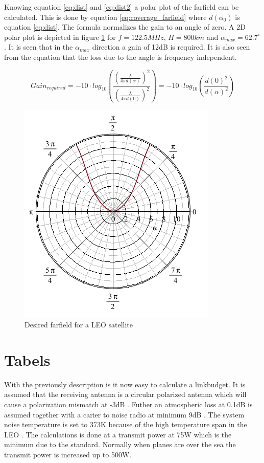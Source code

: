 Knowing equation \ref{eq:dist} and \ref{eq:dist2} a polar plot of the farfield can be calculated. This is done by equation \ref{eq:coverage_farfield} where $d(\alpha_0)$ is equation \ref{eq:dist}. The formula normalizes the gain to an angle of zero. A 2D polar plot 
is depicted in figure \ref{fig:sat_farfield_polar} for $f=122.5MHz$, $H=800km$ and $\alpha_{max} = 62.7^{\circ}$. It is seen that in the $\alpha_{max}$ direction a gain of 12dB is required. It is also seen from the equation that the loss due to the angle is frequency independent.  
  
\begin{equation}
Gain_{required} = -10\cdot log_{10}(\frac{(\frac{\lambda}{4 \pi d(\alpha) })^2}{(\frac{\lambda}{4 \pi d(0) })^2}) = -10\cdot log_{10}(\frac{d(0)^2}{d(\alpha)^2})
\end{equation}
\label{eq:coverage_farfield} 

\begin{figure}[H]
\centering 
\includegraphics[scale = 1]{figures/linkbudget/sat_farfield_polar.png}
\caption{Desired farfield for a LEO satellite}
\label{fig:sat_farfield_polar}
\end{figure} 

\section{Tabels}
With the previously description is it now easy to calculate a linkbudget. It is assumed that the receiving antenna is a circular polarized antenna which will cause a polarization mismatch at -3dB \citep{Balanis2005}. Futher an atmospheric loss at 0.1dB is assumed together with a carier to noise radio at minimum 9dB \citep{itu2017}. The system noise temperature is set to 373K because of the high temperature span in the LEO \citep{FlyingLab}. The calculations is done at a transmit power at 75W which is the minimum due to the standard. Normally when planes are over the sea the transmit power is increased up to 500W.   
 
